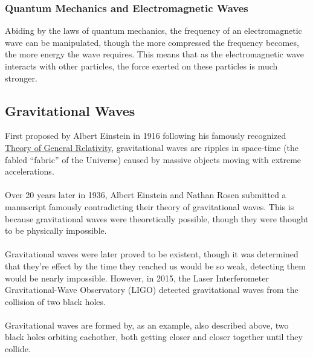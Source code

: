 \documentclass{article}
\begin{document}
\subsubsection{Quantum Mechanics and Electromagnetic Waves}
Abiding by the laws of quantum mechanics, the frequency of an electromagnetic wave can be manipulated, though the more compressed the frequency becomes, the more energy the wave requires. This means that as the electromagnetic wave interacts with other particles, the force exerted on these particles is much stronger.

\subsection{Gravitational Waves}
First proposed by Albert Einstein in 1916 following his famously recognized \hyperref[sec:generalrelativity]{Theory of General Relativity}, gravitational waves are ripples in space-time (the fabled “fabric” of the Universe) caused by massive objects moving with extreme accelerations.\\\\
Over 20 years later in 1936, Albert Einstein and Nathan Rosen submitted a manuscript famously contradicting their theory of gravitational waves. This is because gravitational waves were theoretically possible, though they were thought to be physically impossible. \\\\
Gravitational waves were later proved to be existent, though it was determined that they're effect by the time they reached us would be so weak, detecting them would be nearly impossible. However, in 2015, the Laser Interferometer Gravitational-Wave Observatory (LIGO) detected gravitational waves from the collision of two black holes.\\\\
Gravitational waves are formed by, as an example, also described above, two black holes orbiting eachother, both getting closer and closer together until they collide.
\end{document}
